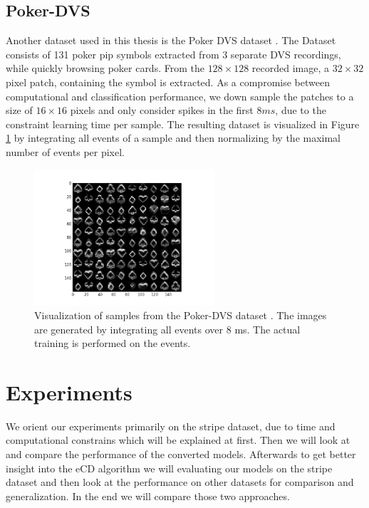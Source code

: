 \subsection{Poker-DVS} \label{c:pokerdvs}

Another dataset used in this thesis is the Poker DVS dataset \cite{serrano2013128}.
The Dataset consists of 131 poker pip symbols extracted from 3 separate DVS recordings, while quickly browsing poker cards.
From the $128 \times 128$ recorded image, a $32 \times 32$ pixel patch, containing the symbol is extracted.
As a compromise between computational and classification performance, we down sample the patches to a size of $16 \times 16$ pixels and only consider spikes in the first $8 ms$, due to the constraint learning time per sample.
The resulting dataset is visualized in Figure \ref{fig:pokerdvs} by integrating all events of a sample and then normalizing by the maximal number of events per pixel.
 
    
\begin{figure}[h!]
	\centering
    	\includegraphics[width=0.6\textwidth]{imgs/poker_ds.png} 
    \caption{Visualization of samples from the Poker-DVS dataset \cite{serrano2013128}. The images are generated by integrating all events over $8$ ms. The actual training is performed on the events.}
	\label{fig:pokerdvs}
\end{figure}


\section{Experiments} \label{c:exps}

We orient our experiments primarily on the stripe dataset, due to time and computational constrains which will be explained at first.
Then we will look at and compare the performance of the converted models.
Afterwards to get better insight into the eCD algorithm we will evaluating our models on the stripe dataset and then look at the performance on other datasets for comparison and generalization.
In the end we will compare those two approaches.

